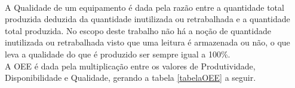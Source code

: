 \begin{center}
\label{produtividade}
\end{center}

\\\null \quad A Qualidade de um equipamento é dada pela razão entre a quantidade total produzida deduzida da quantidade inutilizada ou retrabalhada e a quantidade total produzida. No escopo deste trabalho não há a noção de quantidade inutilizada ou retrabalhada visto que uma leitura é armazenada ou não, o que leva a qualidade do que é produzido ser sempre igual a 100\%.
\\\null \quad A \acrshort{OEE} é dada pela multiplicação entre os valores de Produtividade, Disponibilidade e Qualidade, gerando a tabela \ref{tabelaOEE} a seguir.

